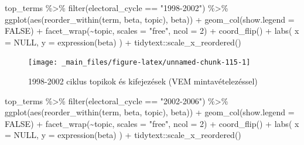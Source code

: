\documentclass[
]{book}
\newenvironment{Shaded}{\begin{snugshade}}{\end{snugshade}}
\newcommand{\AttributeTok}[1]{\textcolor[rgb]{0.77,0.63,0.00}{#1}}
\newcommand{\ConstantTok}[1]{\textcolor[rgb]{0.00,0.00,0.00}{#1}}
\newcommand{\DecValTok}[1]{\textcolor[rgb]{0.00,0.00,0.81}{#1}}
\newcommand{\FunctionTok}[1]{\textcolor[rgb]{0.00,0.00,0.00}{#1}}
\newcommand{\NormalTok}[1]{#1}
\newcommand{\SpecialCharTok}[1]{\textcolor[rgb]{0.00,0.00,0.00}{#1}}
\newcommand{\StringTok}[1]{\textcolor[rgb]{0.31,0.60,0.02}{#1}}
\begin{document}
\begin{Shaded}
\begin{Highlighting}[]
\NormalTok{top\_terms }\SpecialCharTok{\%\textgreater{}\%}
  \FunctionTok{filter}\NormalTok{(electoral\_cycle }\SpecialCharTok{==} \StringTok{"1998{-}2002"}\NormalTok{) }\SpecialCharTok{\%\textgreater{}\%}
  \FunctionTok{ggplot}\NormalTok{(}\FunctionTok{aes}\NormalTok{(}\FunctionTok{reorder\_within}\NormalTok{(term, beta, topic), beta)) }\SpecialCharTok{+}
  \FunctionTok{geom\_col}\NormalTok{(}\AttributeTok{show.legend =} \ConstantTok{FALSE}\NormalTok{) }\SpecialCharTok{+}
  \FunctionTok{facet\_wrap}\NormalTok{(}\SpecialCharTok{\textasciitilde{}}\NormalTok{topic, }\AttributeTok{scales =} \StringTok{"free"}\NormalTok{, }\AttributeTok{ncol =} \DecValTok{2}\NormalTok{) }\SpecialCharTok{+}
  \FunctionTok{coord\_flip}\NormalTok{() }\SpecialCharTok{+}
  \FunctionTok{labs}\NormalTok{(}
    \AttributeTok{x =} \ConstantTok{NULL}\NormalTok{,}
    \AttributeTok{y =} \FunctionTok{expression}\NormalTok{(beta)}
\NormalTok{  ) }\SpecialCharTok{+}
\NormalTok{  tidytext}\SpecialCharTok{::}\FunctionTok{scale\_x\_reordered}\NormalTok{()}
\end{Highlighting}
\end{Shaded}

\begin{figure}

{\centering \texttt{[image: \_main\_files/figure-latex/unnamed-chunk-115-1]} 

}

\caption{1998-2002 ciklus topikok és kifejezések (VEM mintavételezéssel)}\label{fig:unnamed-chunk-115}
\end{figure}

\begin{Shaded}
\begin{Highlighting}[]
\NormalTok{top\_terms }\SpecialCharTok{\%\textgreater{}\%}
  \FunctionTok{filter}\NormalTok{(electoral\_cycle }\SpecialCharTok{==} \StringTok{"2002{-}2006"}\NormalTok{) }\SpecialCharTok{\%\textgreater{}\%}
  \FunctionTok{ggplot}\NormalTok{(}\FunctionTok{aes}\NormalTok{(}\FunctionTok{reorder\_within}\NormalTok{(term, beta, topic), beta)) }\SpecialCharTok{+}
  \FunctionTok{geom\_col}\NormalTok{(}\AttributeTok{show.legend =} \ConstantTok{FALSE}\NormalTok{) }\SpecialCharTok{+}
  \FunctionTok{facet\_wrap}\NormalTok{(}\SpecialCharTok{\textasciitilde{}}\NormalTok{topic, }\AttributeTok{scales =} \StringTok{"free"}\NormalTok{, }\AttributeTok{ncol =} \DecValTok{2}\NormalTok{) }\SpecialCharTok{+}
  \FunctionTok{coord\_flip}\NormalTok{() }\SpecialCharTok{+}
  \FunctionTok{labs}\NormalTok{(}
    \AttributeTok{x =} \ConstantTok{NULL}\NormalTok{,}
    \AttributeTok{y =} \FunctionTok{expression}\NormalTok{(beta)}
\NormalTok{  ) }\SpecialCharTok{+}
\NormalTok{  tidytext}\SpecialCharTok{::}\FunctionTok{scale\_x\_reordered}\NormalTok{()}
\end{Highlighting}
\end{Shaded}
\end{document}
